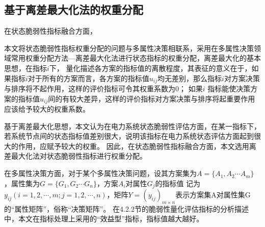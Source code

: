 \subsection{基于离差最大化法的权重分配}
\label{sec:nomalz}
在状态脆弱性指标融合方面，

本文将状态脆弱性指标权重分配的问题与多属性决策相联系，采用在多属性决策领域常用权重分配方法—离差最大化法进行状态指标的权重分配，离差最大化的基本思想，在指标$i$下，
量化描述各方案的指标值的离散程度，其表征的意义在于，如果指标$i$对于所有的方案而言，各方案的指标值$u_{ij}$均无差别，那么指标$i$对方案决策与排序将不起作用，这样的评价指标可令其权重系数为0；
如果$i$ 指标能使决策方案的指标值$u_{ij}$间的有较大差异，这样的评价指标对方案决策与排序将起重要作用应该给予较大的权重系数\cite{refs77,refs78}。

基于离差最大化思想，本文认为在电力系统状态脆弱性评估方面，在某一指标下，若系统节点间的状态指标值差别很大，说明该指标在电力系统状态评估方面起到很大的作用，应赋予较大的权重。
因此，在状态脆弱性指标融合方面，本文选用离差最大化法对状态脆弱性指标进行权重分配。

在多属性决策方面，对于某个多属性决策问题，设其方案集为$A = \{A_1,A_2 \cdots A_m\}$，属性集为$G = \{G_1,G_2 \cdots G_n\}$，方案$A_i$对属性$G_j$的指标值
记为$y_{ij}\left(i = 1,2,\cdots,m;j = 1,2,\cdots,n\right)$，矩阵$Y = \left(y_{ij}\right)_{m \times n}$表示方案集A对属性集G的“属性矩阵”，俗称“决策矩阵”。
在4.2.2节的脆弱性量化评估指标的分析描述中，本文在指标处理上采用的“效益型”指标，指标值越大越好\cite{refs78}。

